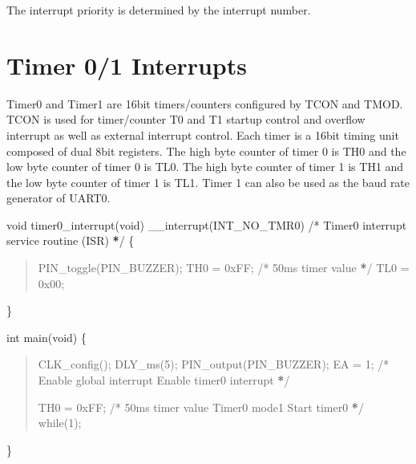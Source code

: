 \documentclass[letterpaper,10pt,english]{sphinxmanual}
\begin{document}
\sphinxAtStartPar
The interrupt priority is determined by the interrupt number.


\section{Timer 0/1  Interrupts}
\label{\detokenize{interrupts:timer-0-1-interrupts}}
\sphinxAtStartPar
Timer0 and Timer1 are 16\sphinxhyphen{}bit timers/counters configured by TCON and TMOD. TCON is used for
timer/counter T0 and T1 startup control and overflow interrupt as well as external interrupt control. Each
timer is a 16\sphinxhyphen{}bit timing unit composed of dual 8\sphinxhyphen{}bit registers. The high byte counter of timer 0 is TH0 and
the low byte counter of timer 0 is TL0. The high byte counter of timer 1 is TH1 and the low byte counter of
timer 1 is TL1. Timer 1 can also be used as the baud rate generator of UART0.
\begin{description}
\sphinxAtStartPar
void timer0\_interrupt(void) \_\_interrupt(INT\_NO\_TMR0)        /* Timer0 interrupt service routine (ISR) {\color{red}\bfseries{}*}/
\{
\begin{quote}

\sphinxAtStartPar
PIN\_toggle(PIN\_BUZZER);
TH0 = 0xFF;             /* 50ms timer value {\color{red}\bfseries{}*}/
TL0 = 0x00;
\end{quote}

\sphinxAtStartPar
\}

\sphinxAtStartPar
int main(void)
\{
\begin{quote}

\sphinxAtStartPar
CLK\_config();
DLY\_ms(5);
PIN\_output(PIN\_BUZZER);
EA  = 1;                /* Enable global interrupt  Enable timer0 interrupt {\color{red}\bfseries{}*}/

\sphinxAtStartPar
TH0 = 0xFF;             /* 50ms timer value  Timer0 mode1  Start timer0 {\color{red}\bfseries{}*}/
while(1);
\end{quote}

\sphinxAtStartPar
\}

\end{description}
\end{document}
